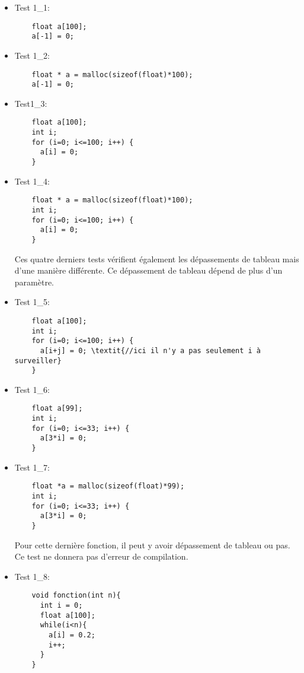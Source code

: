 \documentclass[a4paper,10pt]{report}
\begin{document}
\begin{itemize}
\item Test 1_1:
  \begin{Verbatim}
    float a[100];
    a[-1] = 0; 
  \end{Verbatim}

\item Test 1_2:
  \begin{Verbatim}
    float * a = malloc(sizeof(float)*100);
    a[-1] = 0; 
  \end{Verbatim}

\item Test1_3:
  \begin{Verbatim}
    float a[100];
    int i;
    for (i=0; i<=100; i++) {
      a[i] = 0;
    }
  \end{Verbatim}

\item Test 1_4:
  \begin{Verbatim}
    float * a = malloc(sizeof(float)*100);
    int i;
    for (i=0; i<=100; i++) {
      a[i] = 0;
    }
  \end{Verbatim}

  Ces quatre derniers tests vérifient également les dépassements de tableau mais d'une manière différente. Ce dépassement de tableau dépend de plus d'un paramètre.
\item Test 1_5:
  \begin{Verbatim}
    float a[100];
    int i;
    for (i=0; i<=100; i++) {
      a[i+j] = 0; \textit{//ici il n'y a pas seulement i à surveiller}
    }
  \end{Verbatim}

\item Test 1_6:
  \begin{Verbatim}
    float a[99];
    int i;
    for (i=0; i<=33; i++) {
      a[3*i] = 0;
    }
  \end{Verbatim}


\item Test 1_7:
  \begin{Verbatim}
    float *a = malloc(sizeof(float)*99);
    int i;
    for (i=0; i<=33; i++) {
      a[3*i] = 0;
    }

  \end{Verbatim}

  Pour cette dernière fonction, il peut y avoir dépassement de tableau ou pas. Ce test ne donnera pas d'erreur de compilation.
\item Test 1_8:
  \begin{Verbatim}
    void fonction(int n){
      int i = 0;
      float a[100];
      while(i<n){
        a[i] = 0.2;
        i++;
      }
    }
  \end{Verbatim}

\end{itemize}
\end{document}
